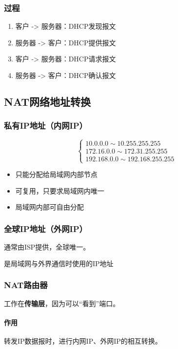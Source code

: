 \subsubsection{过程}
\begin{enumerate}
    \item 客户 -> 服务器：DHCP发现报文
    \item 服务器 -> 客户：DHCP提供报文
    \item 客户 -> 服务器：DHCP请求报文
    \item 服务器 -> 客户：DHCP确认报文
\end{enumerate}


\subsection{NAT网络地址转换}

\subsubsection{私有IP地址（内网IP）}
\[\begin{cases}
    10.0.0.0 \sim 10.255.255.255 \\
    172.16.0.0 \sim 172.31.255.255 \\
    192.168.0.0 \sim 192.168.255.255
\end{cases}\]
\begin{itemize}
    \item 只能分配给局域网内部节点
    \item 可复用，只要求局域网内唯一
    \item 局域网内部可自由分配
\end{itemize}


\subsubsection{全球IP地址（外网IP）}
通常由ISP提供，全球唯一。

是局域网与外界通信时使用的IP地址


\subsubsection{NAT路由器}
工作在\textbf{传输层}，因为可以“看到”端口。

\paragraph{作用}
转发IP数据报时，进行内网IP、外网IP的相互转换。

